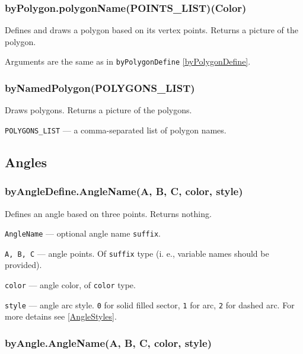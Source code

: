 \documentclass{ltxdoc}
\begin{document}
\subsubsection{byPolygon.polygonName(POINTS\_LIST)(Color)}\label{byPolygon}

	Defines and draws a polygon based on its vertex points. Returns a picture of the polygon.
	
	Arguments are the same as in \texttt{byPolygonDefine} \ref{byPolygonDefine}.



\subsubsection{byNamedPolygon(POLYGONS\_LIST)}\label{byNamedPolygon}
	
	Draws polygons. Returns a picture of the polygons.
	
	\texttt{POLYGONS\_LIST} — a comma-separated list of polygon names.


\subsection{Angles}

\subsubsection{byAngleDefine.AngleName(A, B, C, color, style)}\label{byAngleDefine}
	
	Defines an angle based on three points. Returns nothing.

	\texttt{AngleName} — optional angle name \texttt{suffix}.
		
	\texttt{A, B, C} — angle points. Of \texttt{suffix} type (i. e., variable names should be provided).
	
	\texttt{color} — angle color, of \texttt{color} type.
	
	\texttt{style} — angle arc style. \texttt{0} for solid filled sector, \texttt{1} for arc, \texttt{2} for dashed arc. For more detains see \ref{AngleStyles}.


\subsubsection{byAngle.AngleName(A, B, C, color, style)}\label{byAngle}
\end{document}
